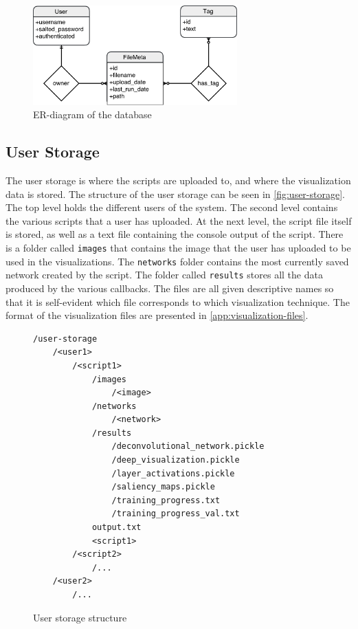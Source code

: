 \begin{figure}[h!]
    \centering
        \includegraphics[width=0.7\textwidth]{fig/database-diagram.pdf}
        \caption{ER-diagram of the database}
        \label{fig:database-diagram}
\end{figure}

\subsection{User Storage} \label{sec:user-storage}

The user storage is where the scripts are uploaded to, and where the visualization data is stored. The structure of the user storage can be seen in \autoref{fig:user-storage}. The top level holds the different users of the system. The second level contains the various scripts that a user has uploaded. At the next level, the script file itself is stored, as well as a text file containing the console output of the script. There is a folder called \texttt{images} that contains the image that the user has uploaded to be used in the visualizations. The \texttt{networks} folder contains the most currently saved network created by the script. The folder called \texttt{results} stores all the data produced by the various callbacks. The files are all given descriptive names so that it is self-evident which file corresponds to which visualization technique. The format of the visualization files are presented in \autoref{app:visualization-files}.

\begin{figure}[h!]
\begin{verbatim}
/user-storage
    /<user1>
        /<script1>
            /images
                /<image>
            /networks
                /<network>
            /results
                /deconvolutional_network.pickle
                /deep_visualization.pickle
                /layer_activations.pickle
                /saliency_maps.pickle
                /training_progress.txt
                /training_progress_val.txt
            output.txt
            <script1>
        /<script2>
            /...
    /<user2>
        /...
\end{verbatim}
\caption{User storage structure}
\label{fig:user-storage}
\end{figure}

